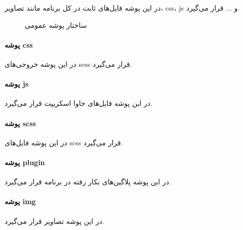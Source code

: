 در این پوشه فایل‌های ثابت در کل برنامه مانند تصاویر، css، js و ... قرار می‌گیرد.

\begin{figure}[H]
	\centering
	\caption{ساختار پوشه عمومی}
	\label{fig:folder-public}
\end{figure}

\paragraph{پوشه css}
در این پوشه خروجی‌های scss قرار می‌گیرد.

\paragraph{پوشه js}
در این پوشه فایل‌های جاوا اسکریپت قرار می‌گیرد.

\paragraph{پوشه scss}
در این پوشه فایل‌های scss قرار می‌گیرد.

\paragraph{پوشه plugin}
در این پوشه پلاگین‌های بکار رفته در برنامه قرار می‌گیرد.

\paragraph{پوشه img}
در این پوشه تصاویر قرار می‌گیرد.
